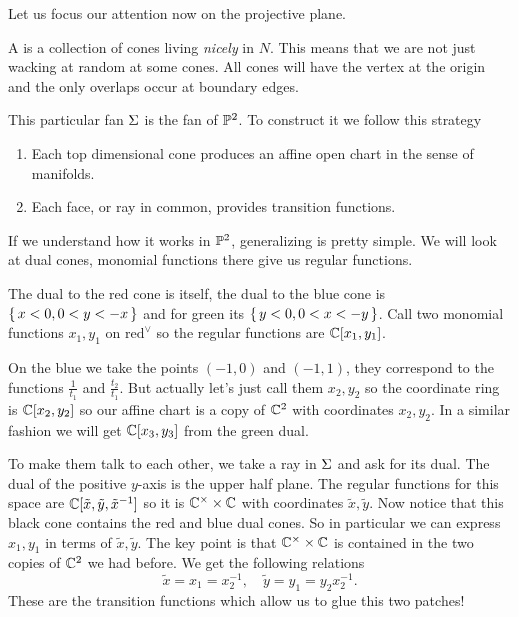 \documentclass[12pt]{memoir}
\theoremstyle{definition}
\begin{document}
Let us focus our attention now on the projective plane.

\begin{Def}
    A  is a collection of cones living \emph{nicely} in $N$. This means that we are not just wacking at random at some cones. All cones will have the vertex at the origin and the only overlaps occur at boundary edges. 
\end{Def}

This particular fan $\Sigma$ is the fan of $\mathbb{P}^2$. To construct it we follow this strategy 
\begin{enumerate}
    \item Each top dimensional cone produces an affine open chart in the sense of manifolds.
    \item Each face, or ray in common, provides transition functions. 
\end{enumerate}

If we understand how it works in $\mathbb{P}^2$, generalizing is pretty simple. We will look at dual cones, monomial functions there give us regular functions. 

\begin{Ex}
    The dual to the red cone is itself, the dual to the blue cone is $\{\,x<0,0<y<-x\,\}$ and for green its $\{\,y<0,0<x<-y\,\}$. Call two monomial functions $x_1,y_1$ on $\text{red}^{\lor}$ so the regular functions are $\mathbb{C}[x_1,y_1]$.\par 
    On the blue we take the points $(-1,0)$ and $(-1,1)$, they correspond to the functions $\frac{1}{t_1}$ and $\frac{t_2}{t_1}$. But actually let's just call them $x_2,y_2$ so the coordinate ring is $\mathbb{C}[x_2,y_2]$ so our affine chart is a copy of $\mathbb{C}^2$ with coordinates $x_2,y_2$. In a similar fashion we will get $\mathbb{C}[x_3,y_3]$ from the green dual.\par 
    To make them talk to each other, we take a ray in $\Sigma$ and ask for its dual. The dual of the positive $y$-axis is the upper half plane. The regular functions for this space are $\mathbb{C}[\tilde x,\tilde y,\tilde x^{-1}]$ so it is $\mathbb{C}^\times\times\mathbb{C}$ with coordinates $\tilde x,\tilde y$. Now notice that this black cone contains the red and blue dual cones. So in particular we can express $x_1,y_1$ in terms of $\tilde x, \tilde y$. The key point is that $\mathbb{C}^\times\times\mathbb{C}$ is contained in the two copies of $\mathbb{C}^2$ we had before. We get the following relations 
    $$\tilde x=x_1=x_2^{-1},\quad \tilde y=y_1=y_2x_2^{-1}.$$
    These are the transition functions which allow us to glue this two patches! 
\end{Ex}
\end{document}
